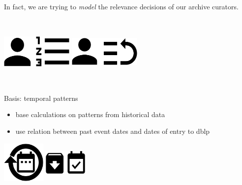 \documentclass[xcolor={svgnames}]{beamer}
\makeatletter
\newcommand*{\currentname}{\@currentlabelname}
\makeatother
\begin{document}
\begin{frame}{\currentname}\linespread{1.5}
  In fact, we are trying to \textit{model} the relevance decisions of our archive curators.

  \centering
  \includegraphics[width=100pt,height=100pt,keepaspectratio]{img/relevance_decision.eps}
  \includegraphics[width=100pt,height=100pt,keepaspectratio]{img/prioritization.eps}
\end{frame}

\begin{frame}{\currentname}\linespread{1.5}
    Basis: temporal patterns
    \begin{itemize}
        \item base calculations on patterns from historical data
        \item use relation between past event dates and dates of entry to dblp
    \end{itemize}
    \vfill
    \begin{center}
        \includegraphics[width=60pt,height=60pt,keepaspectratio]{img/temporal_pattern.eps}%
        \includegraphics[width=60pt,height=60pt,keepaspectratio]{img/entry_date.eps}%
    \end{center}
\end{frame}
\end{document}

